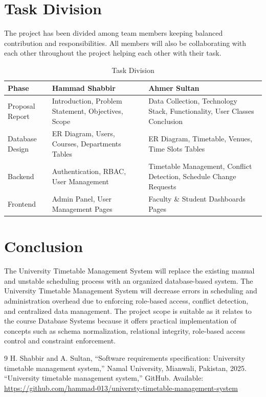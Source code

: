 \documentclass[12pt, a4paper]{report}
\begin{document}
\section{Task Division}
The project has been divided among team members keeping balanced contribution and responsibilities. All members will also be collaborating with each other throughout the project helping each other with their task.
\vspace{0.5em}
\begin{table}[H]
\centering
\small
\begin{tabular}{@{} p{3cm} p{6cm} p{6cm} @{}}
\toprule
\textbf{Phase} & \textbf{Hammad Shabbir} & \textbf{Ahmer Sultan} \\
\midrule
Proposal Report &
Introduction, Problem Statement, Objectives, Scope &
Data Collection, Technology Stack, Functionality, User Classes Conclusion \\
\addlinespace
Database Design &
ER Diagram, Users, Courses, Departments Tables &
ER Diagram, Timetable, Venues, Time Slots Tables \\
\addlinespace
Backend &
Authentication, RBAC, User Management &
Timetable Management, Conflict Detection, Schedule Change Requests \\
\addlinespace
Frontend &
Admin Panel, User Management Pages &
Faculty \& Student Dashboards Pages \\
\bottomrule
\end{tabular}
\caption{Task Division}
\label{tab:task-division}
\end{table}

\section{Conclusion}

The University Timetable Management System will replace the existing manual and unstable scheduling process with an organized database-based system. The University Timetable Management System will decrease errors in scheduling and administration overhead due to enforcing role-based access, conflict detection, and centralized data management. The project scope is suitable as it relates to the course Database Systems because it offers practical implementation of concepts such as schema normalization, relational integrity, role-based access control and constraint enforcement.

\renewcommand{\bibname}{References}
\begin{thebibliography}{9}
H. Shabbir and A. Sultan, ``Software requirements specification: University timetable management system,'' Namal University, Mianwali, Pakistan, 2025.
``University timetable management system,'' GitHub. Available: \url{https://github.com/hammad-013/universty-timetable-management-system}
\end{thebibliography}
\end{document}
